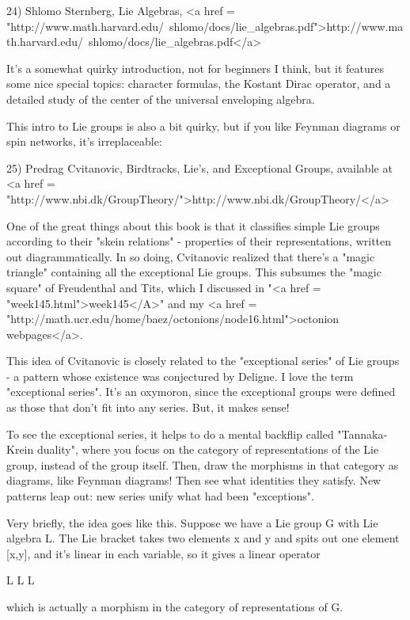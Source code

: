 24) Shlomo Sternberg, Lie Algebras, 
<a href = "http://www.math.harvard.edu/~shlomo/docs/lie_algebras.pdf">http://www.math.harvard.edu/~shlomo/docs/lie_algebras.pdf</a>

It's a somewhat quirky introduction, not for beginners I think, but
it features some nice special topics: character formulas, the Kostant
Dirac operator, and a detailed study of the center of the universal
enveloping algebra.  

This intro to Lie groups is also a bit quirky, but if you like Feynman 
diagrams or spin networks, it's irreplaceable:

25) Predrag Cvitanovic, Birdtracks, Lie's, and Exceptional Groups,
available at <a href = "http://www.nbi.dk/GroupTheory/">http://www.nbi.dk/GroupTheory/</a>

One of the great things about this book is that it classifies simple
Lie groups according to their "skein relations" - properties
of their representations, written out diagrammatically.  In so doing,
Cvitanovic realized that there's a "magic triangle"
containing all the exceptional Lie groups.  This subsumes the
"magic square" of Freudenthal and Tits, which I discussed in
"<a href = "week145.html">week145</A>" and my 
<a href = "http://math.ucr.edu/home/baez/octonions/node16.html">octonion
webpages</a>.

This idea of Cvitanovic is closely related to the "exceptional
series" of Lie groups - a pattern whose existence was conjectured
by Deligne.  I love the term "exceptional series".   It's 
an oxymoron, since the exceptional groups were defined as those that 
don't fit into any series.  But, it makes sense!   

To see the exceptional series, it helps to do a mental backflip called
"Tannaka-Krein duality", where you focus on the category of
representations of the Lie group, instead of the group itself.  Then,
draw the morphisms in that category as diagrams, like Feynman
diagrams!  Then see what identities they satisfy.  New patterns leap
out: new series unify what had been "exceptions".

Very briefly, the idea goes like this.  Suppose we have a Lie group
G with Lie algebra L.  The Lie bracket takes two elements x and y and spits out 
one element [x,y], and it's linear in each variable, so it gives a 
linear operator

L \otimes  L \to  L

which is actually a morphism in the category of representations of G.

